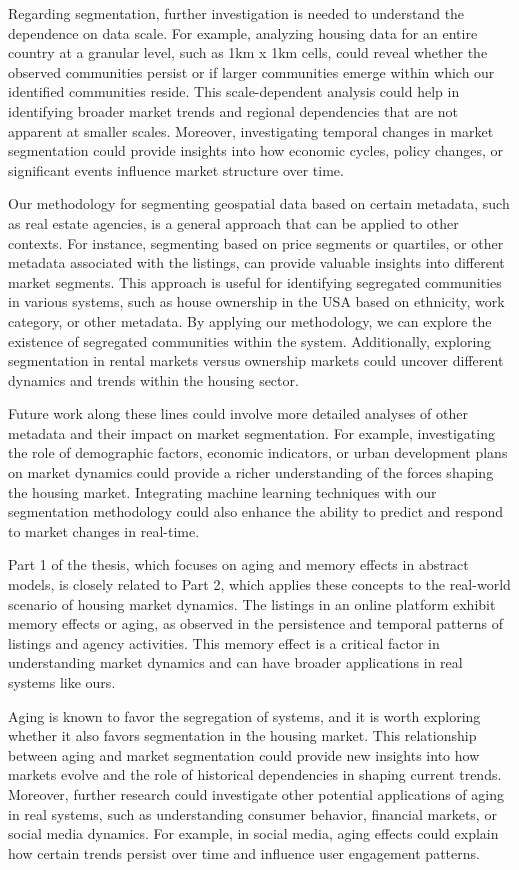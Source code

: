 Regarding segmentation, further investigation is needed to understand the dependence on data scale. For example, analyzing housing data for an entire country at a granular level, such as 1km x 1km cells, could reveal whether the observed communities persist or if larger communities emerge within which our identified communities reside. This scale-dependent analysis could help in identifying broader market trends and regional dependencies that are not apparent at smaller scales. Moreover, investigating temporal changes in market segmentation could provide insights into how economic cycles, policy changes, or significant events influence market structure over time.

Our methodology for segmenting geospatial data based on certain metadata, such as real estate agencies, is a general approach that can be applied to other contexts. For instance, segmenting based on price segments or quartiles, or other metadata associated with the listings, can provide valuable insights into different market segments. This approach is useful for identifying segregated communities in various systems, such as house ownership in the USA based on ethnicity, work category, or other metadata. By applying our methodology, we can explore the existence of segregated communities within the system. Additionally, exploring segmentation in rental markets versus ownership markets could uncover different dynamics and trends within the housing sector.

Future work along these lines could involve more detailed analyses of other metadata and their impact on market segmentation. For example, investigating the role of demographic factors, economic indicators, or urban development plans on market dynamics could provide a richer understanding of the forces shaping the housing market. Integrating machine learning techniques with our segmentation methodology could also enhance the ability to predict and respond to market changes in real-time.

Part 1 of the thesis, which focuses on aging and memory effects in abstract models, is closely related to Part 2, which applies these concepts to the real-world scenario of housing market dynamics. The listings in an online platform exhibit memory effects or aging, as observed in the persistence and temporal patterns of listings and agency activities. This memory effect is a critical factor in understanding market dynamics and can have broader applications in real systems like ours.

Aging is known to favor the segregation of systems, and it is worth exploring whether it also favors segmentation in the housing market. This relationship between aging and market segmentation could provide new insights into how markets evolve and the role of historical dependencies in shaping current trends. Moreover, further research could investigate other potential applications of aging in real systems, such as understanding consumer behavior, financial markets, or social media dynamics. For example, in social media, aging effects could explain how certain trends persist over time and influence user engagement patterns.

